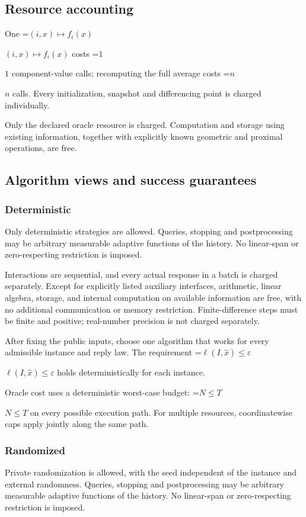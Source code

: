\documentclass[10pt,a4paper]{article}
\newcommand{\AtlasMath}[1]{\par\begingroup\centering\setbox0=\hbox{$\displaystyle #1$}\ifdim\wd0>1.4\linewidth\typeout{ATLAS WIDE FORMULA: \the\wd0}\fi\ifdim\wd0>\linewidth\resizebox{\linewidth}{!}{\box0}\else\box0\fi\par\endgroup}
\newcommand{\AtlasInlineMath}[1]{\begingroup\setbox0=\hbox{$#1$}\ifdim\wd0>.4\linewidth\endgroup\AtlasMath{#1}\else\endgroup$#1$\fi}
\begin{document}
\subsection{Resource accounting}
One \AtlasInlineMath{(i,x)\mapsto f_i(x)} costs \AtlasInlineMath{1} component-value calls; recomputing the full average costs \AtlasInlineMath{n} calls. Every initialization, snapshot and differencing point is charged individually.

Only the declared oracle resource is charged. Computation and storage using existing information, together with explicitly known geometric and proximal operations, are free.

\subsection{Algorithm views and success guarantees}
\subsubsection{Deterministic}
Only deterministic strategies are allowed. Queries, stopping and postprocessing may be arbitrary measurable adaptive functions of the history. No linear-span or zero-respecting restriction is imposed.

Interactions are sequential, and every actual response in a batch is charged separately. Except for explicitly listed auxiliary interfaces, arithmetic, linear algebra, storage, and internal computation on available information are free, with no additional communication or memory restriction. Finite-difference steps must be finite and positive; real-number precision is not charged separately.

After fixing the public inputs, choose one algorithm that works for every admissible instance and reply law. The requirement \AtlasInlineMath{\ell(I,\widehat{x})\le \varepsilon} holds deterministically for each instance.

Oracle cost uses a deterministic worst-case budget: \AtlasInlineMath{N\le T} on every possible execution path. For multiple resources, coordinatewise caps apply jointly along the same path.

\subsubsection{Randomized}
Private randomization is allowed, with the seed independent of the instance and external randomness. Queries, stopping and postprocessing may be arbitrary measurable adaptive functions of the history. No linear-span or zero-respecting restriction is imposed.
\end{document}
